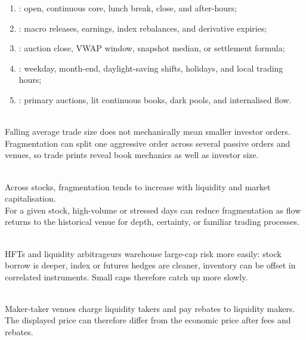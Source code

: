 \begin{taxonomy} 
\begin{enumerate}[label=\roman*.]
\setlength{\itemsep}{0pt}
\item {}: open, continuous core, lunch break, close, and after-hours;
\item {}: macro releases, earnings, index rebalances, and derivative expiries;
\item {}: auction close, VWAP window, snapshot median, or settlement formula;
\item {}: weekday, month-end, daylight-saving shifts, holidays, and local trading hours;
\item {}: primary auctions, lit continuous books, dark pools, and internalised flow.
\end{enumerate}
\end{taxonomy}

\begin{caveat} \\
Falling average trade size does not mechanically mean smaller investor orders.\\
Fragmentation can split one aggressive order across several passive orders and venues, so trade prints reveal book mechanics as well as investor size.
\end{caveat}

\begin{empiricalfinding} \\
Across stocks, fragmentation tends to increase with liquidity and market capitalisation.\\
For a given stock, high-volume or stressed days can reduce fragmentation as flow returns to the historical venue for depth, certainty, or familiar trading processes.
\end{empiricalfinding}

\begin{mechanism} \\
HFTs and liquidity arbitrageurs warehouse large-cap risk more easily: stock borrow is deeper, index or futures hedges are cleaner, inventory can be offset in correlated instruments. Small caps therefore catch up more slowly.
\end{mechanism}

\begin{marketrule} \\
Maker-taker venues charge liquidity takers and pay rebates to liquidity makers. The displayed price can therefore differ from the economic price after fees and rebates.
\end{marketrule}

